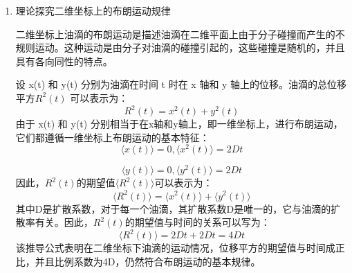 \documentclass[12pt,a4paper,UTF8]{ctexart}
\begin{document}
\begin{enumerate}
\begin{enumerate}[label=\roman*.]
\item 外部力场的影响

实验环境中存在平衡电场，由于电压调节精度较低，不能完全和重力平衡，会对带电的油滴产生作用力。这使得油滴的运动不完全符合布朗运动规律。

\item 流体流动

实验中可能存在微小但持续的流体流动（例如由于温度梯度引起的对流），这种宏观流动会对油滴施加持续的力，使其沿着流动方向移动。即使没有明显的宏观流动，局部的微小流动（如湍流、漩涡等）也可能影响油滴的运动。

\item 实验设计问题

实验装置可能存在微小的倾斜，使得油滴在重力作用下沿着倾斜方向移动。
如果油滴靠近容器壁，壁面效应可能引起油滴沿容器壁移动的现象。

\item 油滴特性
油滴表面的不均匀性或表面活性剂的作用可能导致其在流体中受到不对称的力。
\end{enumerate}

\item 理论探究二维坐标上的布朗运动规律

\par
二维坐标上油滴的布朗运动是描述油滴在二维平面上由于分子碰撞而产生的不规则运动。这种运动是由分子对油滴的碰撞引起的，这些碰撞是随机的，并且具有各向同性的特点。
\par
设 x(t) 和 y(t) 分别为油滴在时间 t 时在 x 轴和 y 轴上的位移。油滴的总位移平方$R^2(t)$ 可以表示为：
\begin{equation}
    		R^2(t)=x^2(t)+y^2(t)
	\end{equation}
 由于 x(t) 和 y(t) 分别相当于在x轴和y轴上，即一维坐标上，进行布朗运动，它们都遵循一维坐标上布朗运动的基本特征：
 \begin{equation}
    		\langle x(t)\rangle =0 ,
		\langle x^2(t)\rangle =2Dt
\end{equation}
\par
\begin{equation}
    		\langle y(t)\rangle =0 , 
		\langle y^2(t)\rangle =2Dt
\end{equation}
因此，$R^2(t)$的期望值$\langle R^2(t)\rangle$可以表示为：
\begin{equation}    		
		\langle R^2(t)\rangle =\langle x^2(t)\rangle+\langle y^2(t)\rangle
\end{equation}
其中D是扩散系数，对于每一个油滴，其扩散系数D是唯一的，它与油滴的扩散率有关。因此，$R^2(t)$的期望值与时间的关系可以写为：
\begin{equation}    		
		\langle R^2(t)\rangle =2Dt+2Dt=4Dt
\end{equation}
该推导公式表明在二维坐标下油滴的运动情况，位移平方的期望值与时间成正比，并且比例系数为4D，仍然符合布朗运动的基本规律。


\end{enumerate}
\end{document}
